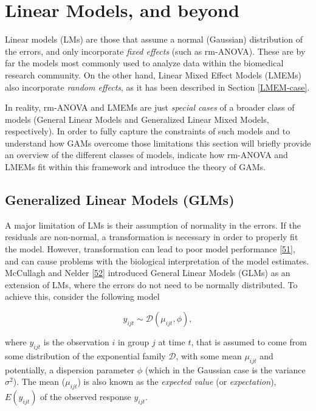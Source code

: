 \documentclass[
]{article}
\begin{document}
\hypertarget{linear-models-and-beyond}{%
\section{Linear Models, and beyond}\label{linear-models-and-beyond}}

Linear models (LMs) are those that assume a normal (Gaussian) distribution of the errors, and only incorporate \emph{fixed effects} (such as rm-ANOVA). These are by far the models most commonly used to analyze data within the biomedical research community. On the other hand, Linear Mixed Effect Models (LMEMs) also incorporate \emph{random effects}, as it has been described in Section \ref{LMEM-case}.

In reality, rm-ANOVA and LMEMs are just \emph{special cases} of a broader class of models (General Linear Models and Generalized Linear Mixed Models, respectively). In order to fully capture the constraints of such models and to understand how GAMs overcome those limitations this section will briefly provide an overview of the different classes of models, indicate how rm-ANOVA and LMEMs fit within this framework and introduce the theory of GAMs.

\hypertarget{generalized-linear-models-glms}{%
\subsection{Generalized Linear Models (GLMs)}\label{generalized-linear-models-glms}}

A major limitation of LMs is their assumption of normality in the errors. If the residuals are non-normal, a transformation is necessary in order to properly fit the model. However, transformation can lead to poor model performance {[}\protect\hyperlink{ref-ohara2010}{51}{]}, and can cause problems with the biological interpretation of the model estimates. McCullagh and Nelder {[}\protect\hyperlink{ref-nelder1972}{52}{]} introduced General Linear Models (GLMs) as an extension of LMs, where the errors do not need to be normally distributed. To achieve this, consider the following model

\begin{equation}
y_{ijt} \sim \mathcal{D}(\mu_{ijt},\phi),
\label{eq:GLM-y}
\end{equation}

where \(y_{ijt}\) is the observation \(i\) in group \(j\) at time \(t\), that is assumed to come from some distribution of the exponential family \(\mathcal{D}\), with some mean \(\mu_{ijt}\) and potentially, a dispersion parameter \(\phi\) (which in the Gaussian case is the variance \(\sigma^{2}\)). The mean (\(\mu_{ijt}\)) is also known as the \emph{expected value} (or \emph{expectation}), \(E(y_{ijt})\) of the observed response \(y_{ijt}\).
\end{document}
